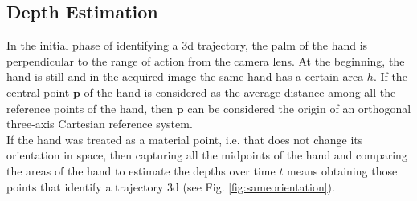 \subsection{Depth Estimation}
\label{subsec:cam-hand}
%
%

In the initial phase of identifying a \gls{3d} trajectory, the palm of the hand is perpendicular to the range of action from the camera lens. At the beginning, the hand is still and in the acquired image the same hand has a certain area $h$. If the central point $\bm{p}$ of the hand is considered as the average distance among all the reference points of the hand, then $\bm{p}$ can be considered the origin of an orthogonal three-axis Cartesian reference system. \\

\noindent If the hand was treated as a material point, i.e. that does not change its orientation in space, then capturing all the midpoints of the hand and comparing the areas of the hand to estimate the depths over time $t$ means obtaining those points that identify a trajectory \gls{3d} (see Fig. \ref{fig:sameorientation}).\\

